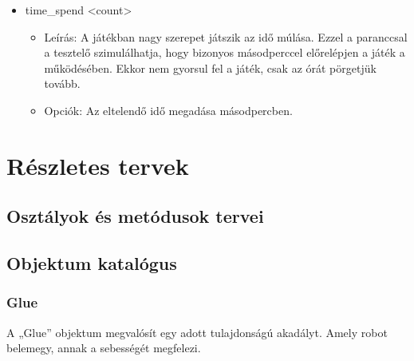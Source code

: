 \begin{itemize}

	
	
	\item  time\_spend <count>
	\begin{itemize}
	\item Leírás: A játékban nagy szerepet játszik az idő múlása. Ezzel a paranccsal a tesztelő szimulálhatja, hogy bizonyos másodperccel előrelépjen a játék a működésében. Ekkor nem gyorsul fel a játék, csak az órát pörgetjük tovább.
	\item Opciók: Az eltelendő idő megadása másodpercben.
	\end{itemize}	
\end{itemize}

\chapter{Részletes tervek}

\thispagestyle{fancy}

\section{Osztályok és metódusok tervei}

\section{Objektum katalógus}

\subsection{Glue}
A „Glue” objektum megvalósít egy adott tulajdonságú akadályt. Amely robot belemegy, annak a sebességét megfelezi. 
